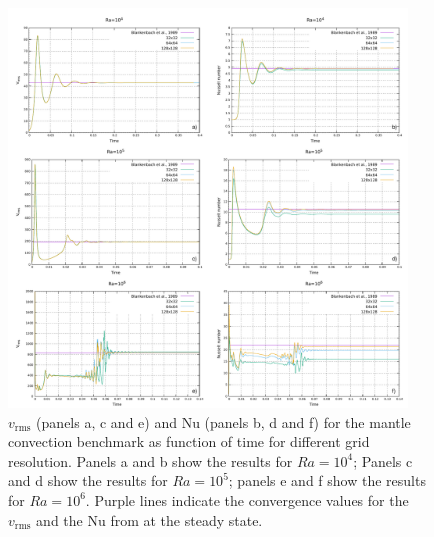 \documentclass[hidelinks,10pt,a4paper]{article}
\begin{document}
\begin{figure}
\centering
\noindent\includegraphics[width=400px]{./Figures/Convection.pdf}
\caption{$v_{\textrm{rms}}$ (panels a, c and e) and Nu (panels b, d and f) for the mantle convection benchmark as function of time for different grid resolution.
Panels a and b show the results for $Ra=10^4$; Panels c and d show the results for $Ra=10^5$; panels e and f show the results for $Ra=10^6$. Purple lines
indicate the convergence values for the $v_{\textrm{rms}}$ and the Nu from \citet{Blankenbach1989} at the steady state.}
\label{fig:mantle}
\end{figure}
\end{document}
